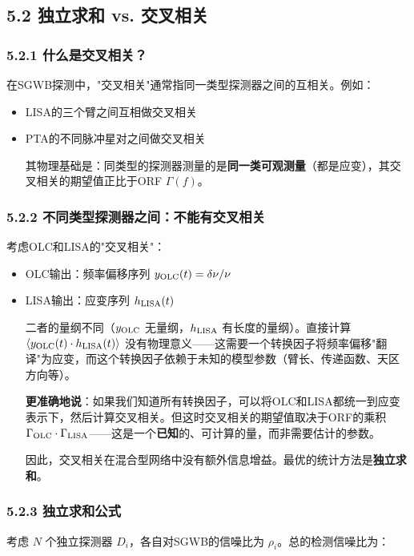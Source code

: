 \documentclass[12pt,a4paper]{article}
\begin{document}
\subsection{5.2 独立求和 vs. 交叉相关}


\subsubsection{5.2.1 什么是交叉相关？}


在SGWB探测中，"交叉相关"通常指同一类型探测器之间的互相关。例如：
\begin{itemize}
  \item LISA的三个臂之间互相做交叉相关
  \item PTA的不同脉冲星对之间做交叉相关

其物理基础是：同类型的探测器测量的是\textbf{同一类可观测量}（都是应变），其交叉相关的期望值正比于ORF $\Gamma(f)$。

\end{itemize}
\subsubsection{5.2.2 不同类型探测器之间：不能有交叉相关}


考虑OLC和LISA的"交叉相关"：
\begin{itemize}
  \item OLC输出：频率偏移序列 $y_{\rm OLC}(t) = \delta\nu/\nu$
  \item LISA输出：应变序列 $h_{\rm LISA}(t)$

二者的量纲不同（$y_{\rm OLC}$ 无量纲，$h_{\rm LISA}$ 有长度的量纲）。直接计算 $\langle y_{\rm OLC}(t) \cdot h_{\rm LISA}(t)\rangle$ 没有物理意义——这需要一个转换因子将频率偏移"翻译"为应变，而这个转换因子依赖于未知的模型参数（臂长、传递函数、天区方向等）。

\textbf{更准确地说}：如果我们知道所有转换因子，可以将OLC和LISA都统一到应变表示下，然后计算交叉相关。但这时交叉相关的期望值取决于ORF的乘积 $\Gamma_{\rm OLC} \cdot \Gamma_{\rm LISA}$——这是一个\textbf{已知}的、可计算的量，而非需要估计的参数。

因此，交叉相关在混合型网络中没有额外信息增益。最优的统计方法是\textbf{独立求和}。

\end{itemize}
\subsubsection{5.2.3 独立求和公式}


考虑 $N$ 个独立探测器 $D_i$，各自对SGWB的信噪比为 $\rho_i$。总的检测信噪比为：
\end{document}
